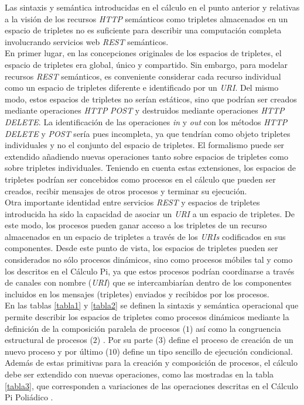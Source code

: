 Las sintaxis y sem\'antica introducidas en el c\'alculo en el punto anterior y relativas a la visi\'on de los recursos \textit{HTTP} sem\'anticos como tripletes almacenados en un espacio de tripletes no es suficiente para describir una computaci\'on completa involucrando servicios web \textit{REST} sem\'anticos.\\
En primer lugar, en las concepciones originales de los espacios de tripletes, el espacio de tripletes era global, \'unico y compartido. Sin embargo, para modelar recursos \textit{REST} sem\'anticos, es conveniente considerar cada recurso individual como un espacio de tripletes diferente e identificado por un \textit{URI}. Del mismo modo, estos espacios de tripletes no ser\'ian est\'aticos, sino que podr\'ian ser creados mediante operaciones \textit{HTTP} \textit{POST} y destruidos mediante operaciones \textit{HTTP} \textit{DELETE}. La identificaci\'on de las operaciones \textit{in} y \textit{out} con los m\'etodos \textit{HTTP} \textit{DELETE} y \textit{POST} ser\'ia pues incompleta, ya que tendr\'ian como objeto tripletes individuales y no el conjunto del espacio de tripletes. El formalismo puede ser extendido \cite{simperl2007coordination} a\~nadiendo nuevas operaciones tanto sobre espacios de tripletes como sobre tripletes individuales. Teniendo en cuenta estas extensiones, los espacios de tripletes podr\'ian ser concebidos como procesos en el c\'alculo que pueden ser creados, recibir mensajes de otros procesos y terminar su ejecuci\'on.\\
Otra importante identidad entre servicios \textit{REST} y espacios de tripletes introducida ha sido la capacidad de asociar un \textit{URI} a un espacio de tripletes. De este modo, los procesos pueden ganar acceso a los tripletes de un recurso almacenados en un espacio de tripletes a trav\'es de los \textit{URIs} codificados en sus componentes. Desde este punto de vista, los espacios de tripletes pueden ser considerados no s\'olo procesos din\'amicos, sino como procesos m\'obiles tal y como los descritos en el C\'alculo Pi, ya que estos procesos podr\'ian coordinarse a trav\'es de canales con nombre (\textit{URI}) que se intercambiar\'ian dentro de los componentes incluidos en los mensajes (tripletes) enviados y recibidos por los procesos.\\
En las tablas \ref{tabla1} y \ref{tabla2} se definen la sintaxis y sem\'antica operacional que permite describir los espacios de tripletes como procesos din\'amicos mediante la definici\'on de la composici\'on paralela de procesos ($1$) as\'i como la congruencia estructural de procesos ($2$) \cite{pi_calculus}. Por su parte ($3$) define el proceso de creaci\'on de un nuevo proceso y por \'ultimo ($10$) define un tipo sencillo de ejecuci\'on condicional.\\
Adem\'as de estas primitivas para la creaci\'on y composici\'on de procesos, el c\'alculo debe ser extendido con nuevas operaciones, como las mostradas en la tabla \ref{tabla3}, que corresponden a variaciones de las operaciones descritas en el C\'alculo Pi Poli\'adico \cite{polyadic_pi}.\\


